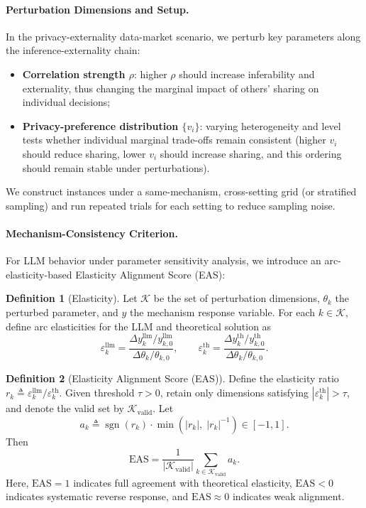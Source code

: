 \documentclass[sigconf,anonymous,review]{acmart}
\theoremstyle{definition}
\newtheorem{definition}{Definition}
\begin{document}
\paragraph{\textbf{Perturbation Dimensions and Setup.}}
In the privacy-externality data-market scenario, we perturb key parameters along the inference-externality chain:
\begin{itemize}
  \item \textbf{Correlation strength \(\rho\)}: higher \(\rho\) should increase inferability and externality, thus changing the marginal impact of others' sharing on individual decisions;
  \item \textbf{Privacy-preference distribution \(\{v_i\}\)}: varying heterogeneity and level tests whether individual marginal trade-offs remain consistent (higher \(v_i\) should reduce sharing, lower \(v_i\) should increase sharing, and this ordering should remain stable under perturbations).
\end{itemize}
We construct instances under a same-mechanism, cross-setting grid (or stratified sampling) and run repeated trials for each setting to reduce sampling noise.


\paragraph{\textbf{Mechanism-Consistency Criterion.}}
For LLM behavior under parameter sensitivity analysis, we introduce an arc-elasticity-based Elasticity Alignment Score (EAS):
\begin{definition}[Elasticity]
Let \(\mathcal{K}\) be the set of perturbation dimensions, \(\theta_k\) the perturbed parameter, and \(y\) the mechanism response variable. For each \(k\in\mathcal{K}\), define arc elasticities for the LLM and theoretical solution as
\[
\varepsilon_k^{\mathrm{llm}}
=
\frac{\Delta y_k^{\mathrm{llm}}/y_{k,0}^{\mathrm{llm}}}{\Delta \theta_k/\theta_{k,0}},
\qquad
\varepsilon_k^{\mathrm{th}}
=
\frac{\Delta y_k^{\mathrm{th}}/y_{k,0}^{\mathrm{th}}}{\Delta \theta_k/\theta_{k,0}}.
\]
\end{definition}

\begin{definition}[Elasticity Alignment Score (EAS)]
Define the elasticity ratio \(r_k\triangleq \varepsilon_k^{\mathrm{llm}}/\varepsilon_k^{\mathrm{th}}\). Given threshold \(\tau>0\), retain only dimensions satisfying
\(|\varepsilon_k^{\mathrm{th}}|>\tau\), and denote the valid set by \(\mathcal{K}_{\mathrm{valid}}\). Let
\[
a_k \triangleq \operatorname{sgn}(r_k)\cdot \min\!\left(|r_k|,\;|r_k|^{-1}\right)\in[-1,1].
\]
Then
\[
\mathrm{EAS}
=
\frac{1}{|\mathcal{K}_{\mathrm{valid}}|}
\sum_{k\in\mathcal{K}_{\mathrm{valid}}} a_k.
\]
Here, \(\mathrm{EAS}=1\) indicates full agreement with theoretical elasticity, \(\mathrm{EAS}<0\) indicates systematic reverse response, and \(\mathrm{EAS}\approx 0\) indicates weak alignment.
\end{definition}
\end{document}
